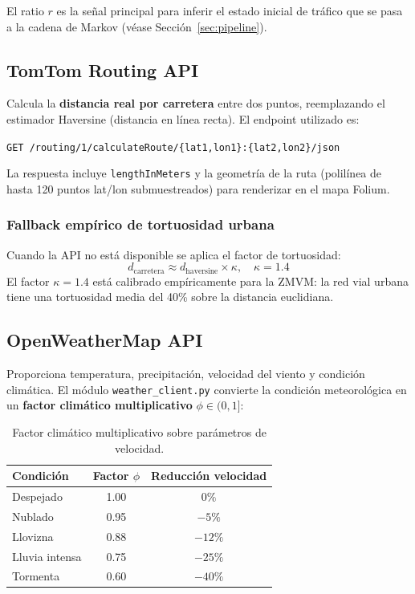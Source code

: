 \documentclass[12pt, a4paper]{article}
\theoremstyle{definition}
\begin{document}
El ratio $r$ es la señal principal para inferir el estado inicial de tráfico
que se pasa a la cadena de Markov (véase Sección~\ref{sec:pipeline}).

\subsection{TomTom Routing API}

Calcula la \textbf{distancia real por carretera} entre dos puntos, reemplazando
el estimador Haversine (distancia en línea recta). El endpoint utilizado es:
\begin{center}
\texttt{GET /routing/1/calculateRoute/\{lat1,lon1\}:\{lat2,lon2\}/json}
\end{center}

La respuesta incluye \texttt{lengthInMeters} y la geometría de la ruta
(polilínea de hasta 120 puntos lat/lon submuestreados) para renderizar en
el mapa Folium.

\subsubsection*{Fallback empírico de tortuosidad urbana}

Cuando la API no está disponible se aplica el factor de tortuosidad:
\begin{equation}
    d_\text{carretera} \approx d_\text{haversine} \times \kappa, \quad \kappa = 1.4
    \label{eq:tortuosidad}
\end{equation}
El factor $\kappa = 1.4$ está calibrado empíricamente para la ZMVM: la red vial
urbana tiene una tortuosidad media del 40\% sobre la distancia euclidiana.

\subsection{OpenWeatherMap API}

Proporciona temperatura, precipitación, velocidad del viento y condición
climática. El módulo \texttt{weather\_client.py} convierte la condición
meteorológica en un \textbf{factor climático multiplicativo} $\phi \in (0,1]$:

\begin{table}[h!]
\centering
\renewcommand{\arraystretch}{1.3}
\begin{tabular}{lcc}
\toprule
\textbf{Condición} & \textbf{Factor $\phi$} & \textbf{Reducción velocidad} \\
\midrule
Despejado    & 1.00 & $0\%$ \\
Nublado      & 0.95 & $-5\%$ \\
Llovizna     & 0.88 & $-12\%$ \\
Lluvia intensa & 0.75 & $-25\%$ \\
Tormenta     & 0.60 & $-40\%$ \\
\bottomrule
\end{tabular}
\caption{Factor climático multiplicativo sobre parámetros de velocidad.}
\end{table}
\end{document}
